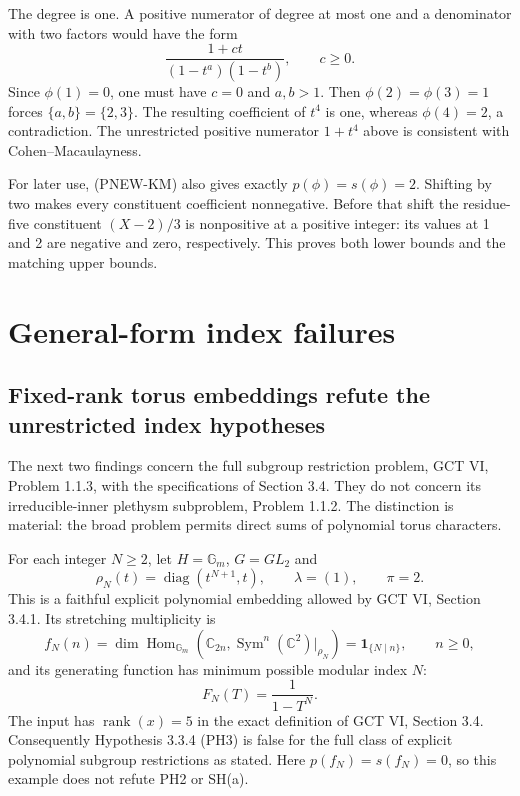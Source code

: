 The degree is one.  A positive numerator of degree at most one
and a denominator with two factors would have the form
\[
                \frac{1+ct}{(1-t^a)(1-t^b)},\qquad c\ge0.
\]
Since $\phi(1)=0$, one must have $c=0$ and $a,b>1$.
Then $\phi(2)=\phi(3)=1$ forces $\{a,b\}=\{2,3\}$.
The resulting coefficient of $t^4$ is one, whereas
$\phi(4)=2$, a contradiction.  The unrestricted positive
numerator $1+t^4$ above is consistent with
Cohen--Macaulayness.

For later use, (PNEW-KM) also gives exactly
$p(\phi)=s(\phi)=2$.  Shifting by two makes every constituent
coefficient nonnegative.  Before that shift the residue-five
constituent $(X-2)/3$ is nonpositive at a positive integer:
its values at 1 and 2 are negative and zero, respectively.
This proves both lower bounds and the matching upper bounds.

\section{General-form index failures}

\subsection{Fixed-rank torus embeddings refute the unrestricted index hypotheses}

The next two findings concern the full subgroup restriction problem,
GCT VI, Problem 1.1.3, with the specifications of Section 3.4.
They do not concern its irreducible-inner plethysm subproblem,
Problem 1.1.2. The distinction is material: the broad problem permits
direct sums of polynomial torus characters.

\begin{proposition}
\label{prop:torusmodular}
For each integer $N\ge2$, let $H=\mathbb G_m$, $G=GL_2$ and
\[
 \rho_N(t)=\operatorname{diag}(t^{N+1},t),\qquad
 \lambda=(1),\qquad \pi=2.
\]
This is a faithful explicit polynomial embedding allowed by
GCT VI, Section 3.4.1. Its stretching multiplicity is
\[
 f_N(n)=\dim\operatorname{Hom}_{\mathbb G_m}
       (\mathbb C_{2n},\operatorname{Sym}^n(\mathbb C^2)|_{\rho_N})
       =\mathbf1_{\{N\mid n\}},\qquad n\ge0,
\]
and its generating function has minimum possible modular index $N$:
\[
 F_N(T)=\frac1{1-T^N}.
 \tag{P-F14}
\]
The input has $\operatorname{rank}(x)=5$ in the exact definition of
GCT VI, Section 3.4. Consequently Hypothesis 3.3.4 (PH3) is false for
the full class of explicit polynomial subgroup restrictions as stated.
Here $p(f_N)=s(f_N)=0$, so this example does not refute PH2 or SH(a).
\end{proposition}

